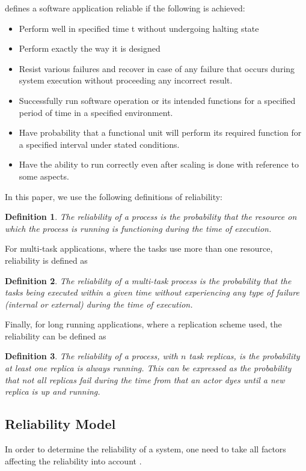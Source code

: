 \documentclass{cslthse-msc}
\newtheorem{definition}{Definition}[chapter]
\begin{document}
\cite{surveyReliabilityDistr} defines a software application reliable if the following is achieved:
\begin{itemize}
\item Perform well in specified time t without undergoing halting state
\item Perform exactly the way it is designed
\item Resist various failures and recover in case of any failure that occurs during system execution without proceeding any incorrect result.
\item Successfully run software operation or its intended functions for a specified period of time in a specified environment.
\item Have probability that a functional unit will perform its required function for a specified interval under stated conditions.
\item Have the ability to run correctly even after scaling is done with reference to some aspects.
\end{itemize}

In this paper, we use the following definitions of reliability:
\begin{definition} \label{def:single_task_reliability}
The reliability of a process is the probability that the resource on which the process is running is functioning during the time of execution.
\end{definition}

For multi-task applications, where the tasks use more than one resource, reliability is defined as
\begin{definition} \label{def:multi_task_reliability}
The reliability of a multi-task process is the probability that the tasks being executed within a given time without experiencing any type of failure (internal or external) during the time of execution.
\end{definition}

Finally, for long running applications, where a replication scheme used, the reliability can be defined as \cite{effTaskReplMobGrid}
\begin{definition} \label{def:task_replica_reliability}
The reliability of a process, with $n$ task replicas, is the probability at least one replica is always running. This can be expressed as the probability that not all replicas fail during the time from that an actor dyes until a new replica is up and running.
\end{definition}

\subsection{Reliability Model}
In order to determine the reliability of a system, one need to take all factors affecting the reliability into account \cite{surveyReliabilityDistr}. 
\end{document}
